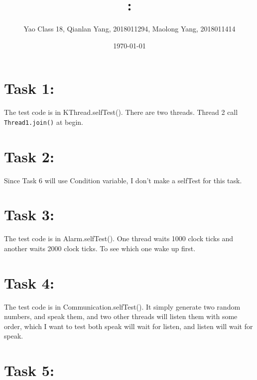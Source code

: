 \documentclass[11pt]{article}
\title{\textmd{\bf \Class: \Title}}
\date{\today}
\author{Yao Class 18, Qianlan Yang, 2018011294, Maolong Yang, 2018011414}
\begin{document}
\begin{spacing}{1.1}
\maketitle \thispagestyle{empty}







\iffalse

\begin{figure}[h]%
	\centering  %
	\texttt{[image: image.jpg]}  %
\end{figure}

\fi

\section{Task 1:}

The test code is in KThread.selfTest(). There are two threads. Thread 2 call \texttt{Thread1.join()} at begin.

\section{Task 2:}

Since Task 6 will use Condition variable, I don't make a selfTest for this task.

\section{Task 3:}

The test code is in Alarm.selfTest(). One thread waits 1000 clock ticks and another waits 2000 clock ticks. To see which one wake up first.

\section{Task 4:}

The test code is in Communication.selfTest(). It simply generate two random numbers, and speak them, and two other threads will listen them with some order, which I want to test both speak will wait for listen, and listen will wait for speak.

\section{Task 5:}


\end{spacing}
\end{document}
